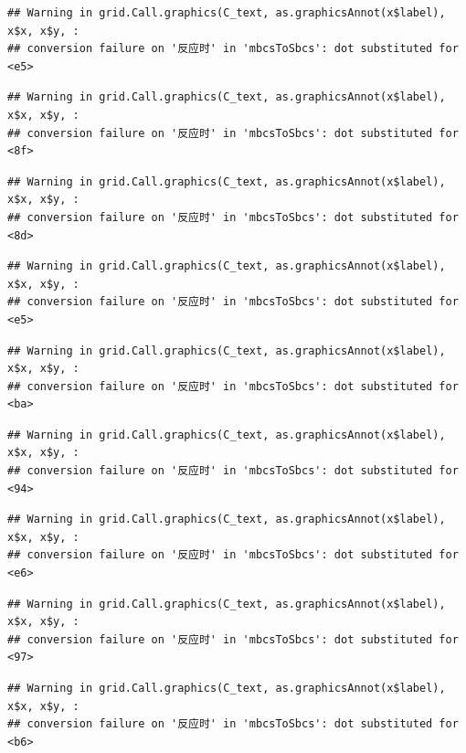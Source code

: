 \documentclass[
]{book}
\begin{document}
\begin{verbatim}
## Warning in grid.Call.graphics(C_text, as.graphicsAnnot(x$label), x$x, x$y, :
## conversion failure on '反应时' in 'mbcsToSbcs': dot substituted for <e5>
\end{verbatim}

\begin{verbatim}
## Warning in grid.Call.graphics(C_text, as.graphicsAnnot(x$label), x$x, x$y, :
## conversion failure on '反应时' in 'mbcsToSbcs': dot substituted for <8f>
\end{verbatim}

\begin{verbatim}
## Warning in grid.Call.graphics(C_text, as.graphicsAnnot(x$label), x$x, x$y, :
## conversion failure on '反应时' in 'mbcsToSbcs': dot substituted for <8d>
\end{verbatim}

\begin{verbatim}
## Warning in grid.Call.graphics(C_text, as.graphicsAnnot(x$label), x$x, x$y, :
## conversion failure on '反应时' in 'mbcsToSbcs': dot substituted for <e5>
\end{verbatim}

\begin{verbatim}
## Warning in grid.Call.graphics(C_text, as.graphicsAnnot(x$label), x$x, x$y, :
## conversion failure on '反应时' in 'mbcsToSbcs': dot substituted for <ba>
\end{verbatim}

\begin{verbatim}
## Warning in grid.Call.graphics(C_text, as.graphicsAnnot(x$label), x$x, x$y, :
## conversion failure on '反应时' in 'mbcsToSbcs': dot substituted for <94>
\end{verbatim}

\begin{verbatim}
## Warning in grid.Call.graphics(C_text, as.graphicsAnnot(x$label), x$x, x$y, :
## conversion failure on '反应时' in 'mbcsToSbcs': dot substituted for <e6>
\end{verbatim}

\begin{verbatim}
## Warning in grid.Call.graphics(C_text, as.graphicsAnnot(x$label), x$x, x$y, :
## conversion failure on '反应时' in 'mbcsToSbcs': dot substituted for <97>
\end{verbatim}

\begin{verbatim}
## Warning in grid.Call.graphics(C_text, as.graphicsAnnot(x$label), x$x, x$y, :
## conversion failure on '反应时' in 'mbcsToSbcs': dot substituted for <b6>
\end{verbatim}
\end{document}
